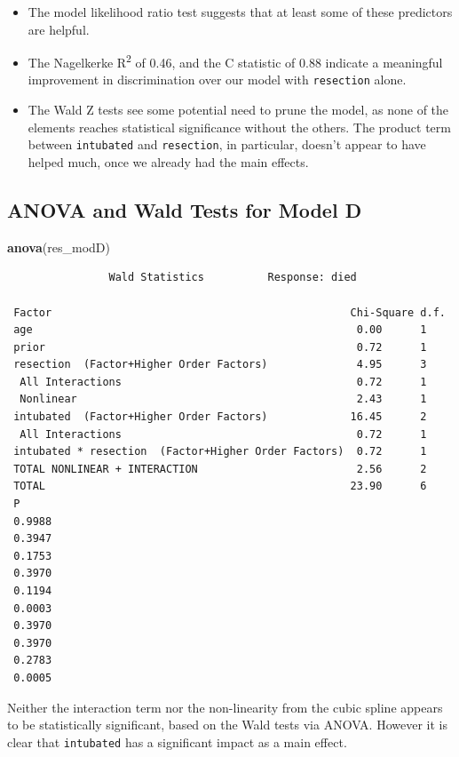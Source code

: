 \documentclass[]{book}
\newenvironment{Shaded}{\begin{snugshade}}{\end{snugshade}}
\newcommand{\KeywordTok}[1]{\textcolor[rgb]{0.13,0.29,0.53}{\textbf{#1}}}
\newcommand{\NormalTok}[1]{#1}
\providecommand{\tightlist}{%
  \setlength{\itemsep}{0pt}\setlength{\parskip}{0pt}}
\theoremstyle{definition}
\theoremstyle{definition}
\theoremstyle{definition}
\theoremstyle{remark}
\begin{document}
\begin{itemize}
\tightlist
\item
  The model likelihood ratio test suggests that at least some of these
  predictors are helpful.
\item
  The Nagelkerke R\textsuperscript{2} of 0.46, and the C statistic of
  0.88 indicate a meaningful improvement in discrimination over our
  model with \texttt{resection} alone.
\item
  The Wald Z tests see some potential need to prune the model, as none
  of the elements reaches statistical significance without the others.
  The product term between \texttt{intubated} and \texttt{resection}, in
  particular, doesn't appear to have helped much, once we already had
  the main effects.
\end{itemize}

\subsection{ANOVA and Wald Tests for Model
D}\label{anova-and-wald-tests-for-model-d}

\begin{Shaded}
\begin{Highlighting}[]
\KeywordTok{anova}\NormalTok{(res_modD)}
\end{Highlighting}
\end{Shaded}

\begin{verbatim}
                Wald Statistics          Response: died 

 Factor                                               Chi-Square d.f.
 age                                                   0.00      1   
 prior                                                 0.72      1   
 resection  (Factor+Higher Order Factors)              4.95      3   
  All Interactions                                     0.72      1   
  Nonlinear                                            2.43      1   
 intubated  (Factor+Higher Order Factors)             16.45      2   
  All Interactions                                     0.72      1   
 intubated * resection  (Factor+Higher Order Factors)  0.72      1   
 TOTAL NONLINEAR + INTERACTION                         2.56      2   
 TOTAL                                                23.90      6   
 P     
 0.9988
 0.3947
 0.1753
 0.3970
 0.1194
 0.0003
 0.3970
 0.3970
 0.2783
 0.0005
\end{verbatim}

Neither the interaction term nor the non-linearity from the cubic spline
appears to be statistically significant, based on the Wald tests via
ANOVA. However it is clear that \texttt{intubated} has a significant
impact as a main effect.
\end{document}
